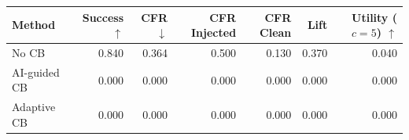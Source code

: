 \begin{tabular}{lrrrrrr}
\toprule
Method & Success $\uparrow$ & CFR $\downarrow$ & CFR Injected & CFR Clean & Lift & Utility ($c=5$) $\uparrow$ \\
\midrule
No CB & 0.840 & 0.364 & 0.500 & 0.130 & 0.370 & 0.040 \\
AI-guided CB & 0.000 & 0.000 & 0.000 & 0.000 & 0.000 & 0.000 \\
Adaptive CB & 0.000 & 0.000 & 0.000 & 0.000 & 0.000 & 0.000 \\
\bottomrule
\end{tabular}
